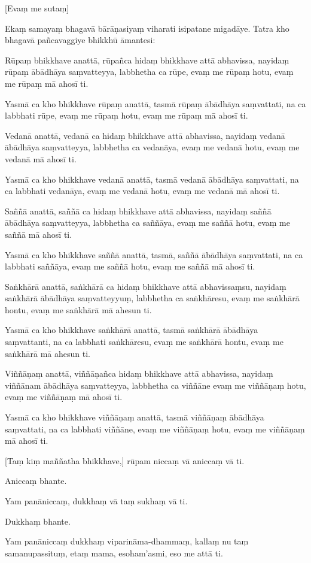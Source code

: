 [Evaṃ me sutaṃ]

Ekaṃ samayaṃ bhagavā bārāṇasiyaṃ viharati isipatane migadāye. Tatra kho
bhagavā pañcavaggiye bhikkhū āmantesi:

Rūpaṃ bhikkhave anattā, rūpañca hidaṃ bhikkhave attā abhavissa, nayidaṃ
rūpaṃ ābādhāya saṃvatteyya, labbhetha ca rūpe, evaṃ me rūpaṃ hotu, evaṃ
me rūpaṃ mā ahosī ti.

Yasmā ca kho bhikkhave rūpaṃ anattā, tasmā rūpaṃ ābādhāya saṃvattati, na ca
labbhati rūpe, evaṃ me rūpaṃ hotu, evaṃ me rūpaṃ mā ahosī ti.

Vedanā anattā, vedanā ca hidaṃ bhikkhave attā abhavissa, nayidaṃ vedanā
ābādhāya saṃvatteyya, labbhetha ca vedanāya, evaṃ me vedanā hotu, evaṃ
me vedanā mā ahosī ti.

Yasmā ca kho bhikkhave vedanā anattā, tasmā vedanā ābādhāya saṃvattati, na ca
labbhati vedanāya, evaṃ me vedanā hotu, evaṃ me vedanā mā ahosī ti.

Saññā anattā, saññā ca hidaṃ bhikkhave attā abhavissa, nayidaṃ saññā
ābādhāya saṃvatteyya, labbhetha ca saññāya, evaṃ me saññā hotu, evaṃ me
saññā mā ahosī ti.

Yasmā ca kho bhikkhave saññā anattā, tasmā, saññā ābādhāya saṃvattati,
na ca labbhati saññāya, evaṃ me saññā hotu, evaṃ me saññā mā ahosī ti.

Saṅkhārā anattā, saṅkhārā ca hidaṃ bhikkhave attā abhavissaṃsu, nayidaṃ
saṅkhārā ābādhāya saṃvatteyyuṃ, labbhetha ca saṅkhāresu, evaṃ me
saṅkhārā hontu, evaṃ me saṅkhārā mā ahesun ti.

Yasmā ca kho bhikkhave saṅkhārā anattā, tasmā saṅkhārā ābādhāya
saṃvattanti, na ca labbhati saṅkhāresu, evaṃ me saṅkhārā hontu, evaṃ me
saṅkhārā mā ahesun ti.

Viññāṇaṃ anattā, viññāṇañca hidaṃ bhikkhave attā abhavissa, nayidaṃ
viññānam ābādhāya saṃvatteyya, labbhetha ca viññāne evaṃ me viññāṇaṃ
hotu, evaṃ me viññāṇaṃ mā ahosī ti.

Yasmā ca kho bhikkhave viññāṇaṃ anattā, tasmā viññāṇaṃ ābādhāya
saṃvattati, na ca labbhati viññāne, evaṃ me viññāṇaṃ hotu, evaṃ me
viññāṇaṃ mā ahosī ti.

[Taṃ kiṃ maññatha bhikkhave,] rūpam niccaṃ vā aniccaṃ vā ti.

Aniccaṃ bhante.

Yam panāniccaṃ, dukkhaṃ vā taṃ sukhaṃ vā ti.

Dukkhaṃ bhante.

Yam panāniccaṃ dukkhaṃ viparināma-dhammaṃ, kallaṃ nu taṃ samanupassituṃ,
etaṃ mama, esoham'asmi, eso me attā ti.

